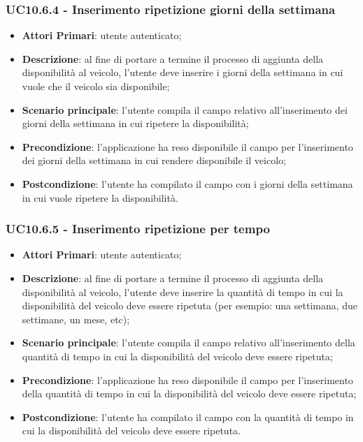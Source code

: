 \subsubsection{UC10.6.4 - Inserimento ripetizione giorni della settimana}
\begin{itemize}
	\item \textbf{Attori Primari}: utente autenticato;
	\item \textbf{Descrizione}: al fine di portare a termine il processo di aggiunta della disponibilità al veicolo, l'utente deve inserire i giorni della settimana in cui vuole che il veicolo sia disponibile;
	\item \textbf{Scenario principale}: l'utente compila il campo relativo all'inserimento dei giorni della settimana in cui ripetere la disponibilità;	
	\item \textbf{Precondizione}: l'applicazione ha reso disponibile il campo per l'inserimento dei giorni della settimana in cui rendere disponibile il veicolo;
	\item \textbf{Postcondizione}: l'utente ha compilato il campo con i giorni della settimana in cui vuole ripetere la disponibilità.	
\end{itemize}
\subsubsection{UC10.6.5 - Inserimento ripetizione per tempo}
\begin{itemize}
	\item \textbf{Attori Primari}: utente autenticato;
	\item \textbf{Descrizione}: al fine di portare a termine il processo di aggiunta della disponibilità al veicolo, l'utente deve inserire la quantità di tempo in cui la disponibilità del veicolo deve essere ripetuta (per esempio: una settimana, due settimane, un mese, etc);
	\item \textbf{Scenario principale}: l'utente compila il campo relativo all'inserimento della quantità di tempo in cui la disponibilità del veicolo deve essere ripetuta;	
	\item \textbf{Precondizione}: l'applicazione ha reso disponibile il campo per l'inserimento della quantità di tempo in cui la disponibilità del veicolo deve essere ripetuta;
	\item \textbf{Postcondizione}: l'utente ha compilato il campo con la quantità di tempo in cui la disponibilità del veicolo deve essere ripetuta.	
\end{itemize}